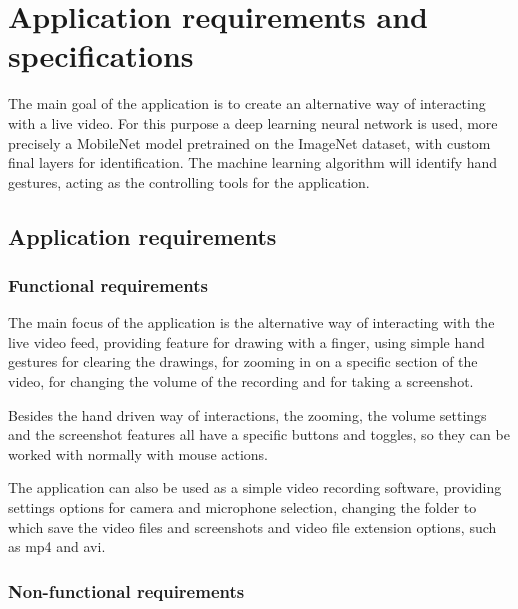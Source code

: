 \chapter{Application requirements and specifications}
\label{chap:specs}

\par The main goal of the application is to create an alternative way of interacting with a live video. For this purpose a deep learning neural network is used, more precisely a MobileNet model pretrained on the ImageNet dataset, with custom final layers for identification. The machine learning algorithm will identify hand gestures, acting as the controlling tools for the application. 

\section{Application requirements}
\label{sec:specssec1}

\subsection{Functional requirements}
\label{sec:specssec1subsec1}

\par The main focus of the application is the alternative way of interacting with the live video feed, providing feature for drawing with a finger, using simple hand gestures for clearing the drawings, for zooming in on a specific section of the video, for changing the volume of the recording and for taking a screenshot.
\par Besides the hand driven way of interactions, the zooming, the volume settings and the screenshot features all have a specific buttons and toggles, so they can be worked with normally with mouse actions.
\par The application can also be used as a simple video recording software, providing settings options for camera and microphone selection, changing the folder to which save the video files and screenshots and video file extension options, such as mp4 and avi.

\subsection{Non-functional requirements}
\label{sec:specssec1subsec2}

